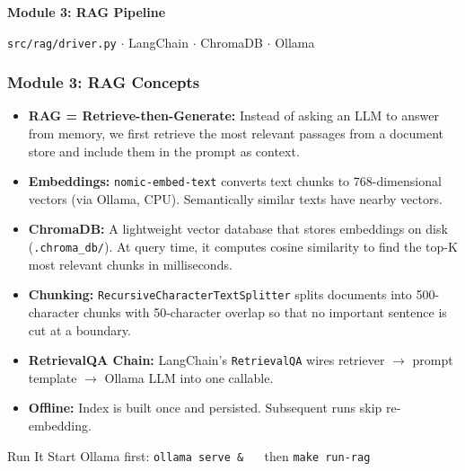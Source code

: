 \begin{frame}[fragile]\frametitle{}
\begin{center}
{\Large \textbf{Module 3: RAG Pipeline}}\

\texttt{src/rag/driver.py} $\cdot$ LangChain $\cdot$ ChromaDB $\cdot$ Ollama
\end{center}
\end{frame}

\begin{frame}[fragile]\frametitle{Module 3: RAG Concepts}
\begin{itemize}
  \item \textbf{RAG = Retrieve-then-Generate:} Instead of asking an LLM to answer from memory, we first retrieve the most relevant passages from a document store and include them in the prompt as context.
  \item \textbf{Embeddings:} \texttt{nomic-embed-text} converts text chunks to 768-dimensional vectors (via Ollama, CPU). Semantically similar texts have nearby vectors.
  \item \textbf{ChromaDB:} A lightweight vector database that stores embeddings on disk (\texttt{.chroma\_db/}). At query time, it computes cosine similarity to find the top-K most relevant chunks in milliseconds.
  \item \textbf{Chunking:} \texttt{RecursiveCharacterTextSplitter} splits documents into 500-character chunks with 50-character overlap so that no important sentence is cut at a boundary.
  \item \textbf{RetrievalQA Chain:} LangChain's \texttt{RetrievalQA} wires retriever $\rightarrow$ prompt template $\rightarrow$ Ollama LLM into one callable.
  \item \textbf{Offline:} Index is built once and persisted. Subsequent runs skip re-embedding.
\end{itemize}
\begin{block}{Run It}
  Start Ollama first: \texttt{ollama serve \&} $\quad$ then \texttt{make run-rag}
\end{block}
\end{frame}


